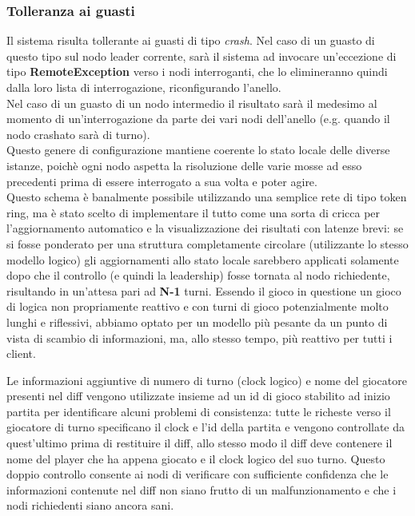 \subsubsection{Tolleranza ai guasti}
Il sistema risulta tollerante ai guasti di tipo \emph{crash}.
	Nel caso di un guasto di questo tipo sul nodo leader corrente, sar\`a il
	sistema ad invocare un'eccezione di tipo \textbf{RemoteException} verso
	i nodi interroganti, che lo elimineranno quindi dalla loro lista di
	interrogazione, riconfigurando l'anello.\\
	Nel caso di un guasto di un nodo intermedio il risultato sar\`a il
	medesimo al momento di un'interrogazione da parte dei vari nodi
	dell'anello (e.g. quando il nodo crashato sar\`a di turno).\\
	Questo genere di configurazione mantiene coerente lo stato locale delle
	diverse istanze, poich\`e ogni nodo aspetta la risoluzione delle varie
	mosse ad esso precedenti prima di essere interrogato a sua volta e poter
	agire.\\
	Questo schema \`e banalmente possibile utilizzando una semplice rete di
	tipo token ring, ma \`e stato scelto di implementare il tutto come una
	sorta di cricca per l'aggiornamento automatico e la visualizzazione dei
	risultati con latenze brevi: se si fosse ponderato per una struttura
	completamente circolare (utilizzante lo stesso modello logico) gli
	aggiornamenti allo stato locale sarebbero applicati solamente dopo che
	il controllo (e quindi la leadership) fosse tornata al nodo richiedente,
	risultando in un'attesa pari ad \textbf{N-1} turni. Essendo il gioco
	in questione un gioco di logica non propriamente reattivo e con turni
	di gioco potenzialmente molto lunghi e riflessivi, abbiamo optato
	per un modello pi\`u pesante da un punto di vista
	di scambio di informazioni, ma, allo stesso tempo, pi\`u reattivo per tutti i client.

	Le informazioni aggiuntive di numero di turno (clock logico) e nome del giocatore presenti nel diff vengono utilizzate insieme ad un id di gioco stabilito ad inizio partita per identificare alcuni problemi di consistenza: tutte le richeste verso il giocatore di turno specificano il clock e l'id della partita e vengono controllate da quest'ultimo prima di restituire il diff, allo stesso modo il diff deve contenere il nome del player che ha appena giocato e il clock logico del suo turno.
	Questo doppio controllo consente ai nodi di verificare con sufficiente confidenza che le informazioni contenute nel diff non siano frutto di un malfunzionamento e che i nodi richiedenti siano ancora sani.

